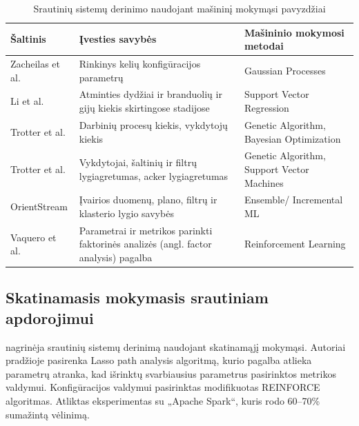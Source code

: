 \documentclass{VUMIFPSbakalaurinis}
\begin{document}
\begin{table}[H]
    \centering
    \caption{Srautinių sistemų derinimo naudojant mašininį mokymąsi pavyzdžiai \cite{herodotou2020survey}}
    \begin{tabular}{|l|p{}|p{}|}
    \hline
    Šaltinis                                        & Įvesties savybės                                                                    & Mašininio mokymosi metodai                 \\ \hline
    Zacheilas et al. \cite{zacheilas2015elastic}    & Rinkinys kelių konfigūracijos parametrų                                             & Gaussian Processes                         \\ \hline
    Li et al. \cite{li2016performance}              & Atminties dydžiai ir branduolių ir gijų kiekis skirtingose stadijose                & Support Vector Regression                  \\ \hline
    Trotter et al. \cite{Trotter2017Into}           & Darbinių procesų kiekis, vykdytojų kiekis                                           & Genetic Algorithm, Bayesian Optimization   \\ \hline
    Trotter et al. \cite{trotter2019forecasting}    & Vykdytojai, šaltinių ir filtrų lygiagretumas, acker lygiagretumas                   & Genetic Algorithm, Support Vector Machines \\ \hline
    OrientStream \cite{wang2017automating}          & Įvairios duomenų, plano, filtrų ir klasterio lygio savybės                          & Ensemble/ Incremental ML                    \\ \hline
    Vaquero et al. \cite{vaquero2018autotuning}     & Parametrai ir metrikos parinkti faktorinės analizės (angl. factor analysis) pagalba & Reinforcement Learning                     \\ \hline
    \end{tabular}
    \label{ml-in-stream}
\end{table}

\subsection{Skatinamasis mokymasis srautiniam apdorojimui}

\cite{vaquero2018autotuning} nagrinėja srautinių sistemų derinimą naudojant skatinamąjį mokymąsi. Autoriai pradžioje pasirenka Lasso path analysis algoritmą, kurio pagalba atlieka parametrų atranka, kad išrinktų svarbiausius parametrus pasirinktos metrikos valdymui. Konfigūracijos valdymui pasirinktas modifikuotas REINFORCE algoritmas. Atliktas eksperimentas su „Apache Spark“, kuris rodo 60–70\% sumažintą vėlinimą.
\end{document}
